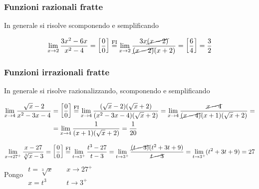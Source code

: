 \subsubsection{Funzioni razionali fratte}
In generale si risolve scomponendo e semplificando
\begin{ex}
\[\lim_{x\to 2} \frac{3x^2-6x}{x^2-4}= \left[\frac{0}{0}\right]\overset{\mathrm{FI}}{=}\lim_{x\to 2}\frac{3x\cancel{(x-2)}}{{\cancel{(x-2)}}(x+2)}=\left[\frac{6}{4}\right]=\frac{3}{2}\]
\end{ex}
\subsubsection{Funzioni irrazionali fratte}
In generale si risolve razionalizzando, scomponendo e semplificando
\begin{ex}
\[\begin{aligned}\lim_{x\to 4}\frac{\sqrt{x}-2}{x^2-3x-4}&= \left[\frac{0}{0}\right]\overset{\mathrm{FI}}{=}\lim_{x\to 4}\frac{(\sqrt{x}-2)(\sqrt{x}+2)}{(x^2-3x-4)(\sqrt{x}+2)}=\lim_{x\to 4}\frac{\cancel{x-4}}{\cancel{(x-4)}(x+1)(\sqrt{x}+2)} =\\&=\lim_{x\to 4}\frac{1}{(x+1)(\sqrt{x}+2)}=\frac{1}{20}\end{aligned}\]
\end{ex}
\begin{ex}
\[\lim_{x\to27^+}\frac{x-27}{\sqrt[3]{x}-3}=\left[\frac{0}{0}\right]\overset{\mathrm{FI}}{=}\lim_{t\to3^+}\frac{t^3-27}{t-3}=\lim_{t\to3^+}\frac{\cancel{(t-3)}(t^2+3t+9)}{\cancel{t-3}}=\lim_{t\to3^+}(t^2+3t+9)=27\]
Pongo $\begin{array}{ll}
    t=\sqrt[3]{x}~~~~~ &  x\to27^+\\
    x=t^3 & t\to 3^+
\end{array}$
\end{ex}
